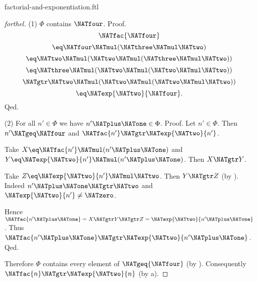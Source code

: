 \documentclass{naproche-library}
\begin{document}
\begin{smodule}[title=Factorial and Exponentiation]{factorial-and-exponentiation.ftl}
\begin{proof}[forthel]
  (1) $\Phi$ contains $\NATfour$. \newline
  Proof.
    \[  \NATfac{\NATfour}                                  \]
    \[    \eq \NATfour \NATmul (\NATthree \NATmul \NATtwo)             \]
    \[    \eq \NATtwo \NATmul (\NATtwo \NATmul (\NATthree \NATmul \NATtwo))   \]
    \[    \eq \NATthree \NATmul (\NATtwo \NATmul (\NATtwo \NATmul \NATtwo))   \]
    \[    \NATgtr \NATtwo \NATmul (\NATtwo \NATmul (\NATtwo \NATmul \NATtwo))   \]
    \[    \eq \NATexp{\NATtwo}{\NATfour}.                          \]
  Qed.

  (2) For all $n' \in \Phi$ we have $n' \NATplus \NATone \in \Phi$. \newline
  Proof.
    Let $n' \in \Phi$.
    Then $n' \NATgeq \NATfour$ and $\NATfac{n'} \NATgtr \NATexp{\NATtwo}{n'}$.

    Take $X \eq \NATfac{n'} \NATmul (n' \NATplus \NATone)$ and $Y \eq \NATexp{\NATtwo}{n'} \NATmul (n' \NATplus \NATone)$.
    Then $X \NATgtr Y$.

    Take $Z \eq \NATexp{\NATtwo}{n'} \NATmul \NATtwo$.
    Then $Y \NATgtr Z$ (by ).
    Indeed $n' \NATplus \NATone \NATgtr \NATtwo$ and $\NATexp{\NATtwo}{n'} \neq \NATzero$.

    Hence $\NATfac{n' \NATplus \NATone} = X \NATgtr Y \NATgtr Z = \NATexp{\NATtwo}{n' \NATplus \NATone}$.
    Thus $\NATfac{n' \NATplus \NATone} \NATgtr \NATexp{\NATtwo}{n' \NATplus \NATone}$.
  Qed.

  Therefore $\Phi$ contains every element of $\NATgeq{\NATfour}$ (by ).
  Consequently $\NATfac{n} \NATgtr \NATexp{\NATtwo}{n}$ (by a).
\end{proof}
\end{smodule}
\end{document}
